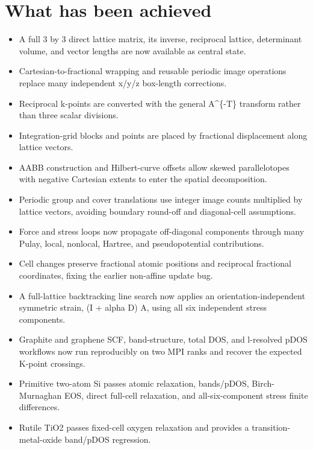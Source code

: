 \documentclass[10pt,a4paper]{report}
\begin{document}
\section{What has been achieved}
\begin{itemize}
\item A full 3 by 3 direct lattice matrix, its inverse, reciprocal lattice, determinant volume, and vector lengths are now available as central state.
\item Cartesian-to-fractional wrapping and reusable periodic image operations replace many independent x/y/z box-length corrections.
\item Reciprocal k-points are converted with the general A\textasciicircum{}\{-T\} transform rather than three scalar divisions.
\item Integration-grid blocks and points are placed by fractional displacement along lattice vectors.
\item AABB construction and Hilbert-curve offsets allow skewed parallelotopes with negative Cartesian extents to enter the spatial decomposition.
\item Periodic group and cover translations use integer image counts multiplied by lattice vectors, avoiding boundary round-off and diagonal-cell assumptions.
\item Force and stress loops now propagate off-diagonal components through many Pulay, local, nonlocal, Hartree, and pseudopotential contributions.
\item Cell changes preserve fractional atomic positions and reciprocal fractional coordinates, fixing the earlier non-affine update bug.
\item A full-lattice backtracking line search now applies an orientation-independent symmetric strain, (I + alpha D) A, using all six independent stress components.
\item Graphite and graphene SCF, band-structure, total DOS, and l-resolved pDOS workflows now run reproducibly on two MPI ranks and recover the expected K-point crossings.
\item Primitive two-atom Si passes atomic relaxation, bands/pDOS, Birch-Murnaghan EOS, direct full-cell relaxation, and all-six-component stress finite differences.
\item Rutile TiO2 passes fixed-cell oxygen relaxation and provides a transition-metal-oxide band/pDOS regression.
\end{itemize}
\end{document}
